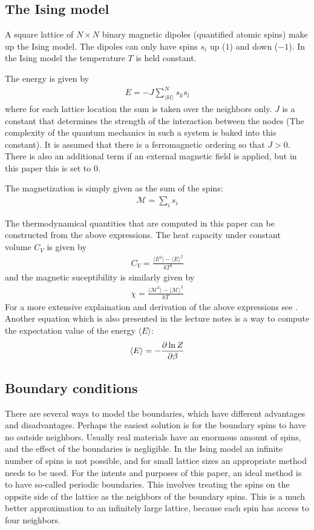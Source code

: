 \documentclass[aps,reprint]{revtex4-1}
\newcommand{\mean}[1]{\langle #1 \rangle}
\begin{document}
\subsection{The Ising model}
A square lattice of $N \times N$ binary magnetic dipoles (quantified atomic spins)
make up the Ising model. The dipoles can only have spins $s_i$ up ($1$) and down ($-1$).
In the Ising model the temperature $T$ is held constant.

The energy is given by
\begin{align}\label{eq:energy}
  E = -J \sum_{\langle kl \rangle}^{N} s_k s_l
\end{align}
where for each lattice location the sum is taken over the neighbors only. $J$ is
a constant that determines the strength of the interaction between the nodes
(The complexity of the quantum mechanics in such a system is baked into
this constant). It is assumed that there is a ferromagnetic ordering so that $J > 0$.
There is also an additional term if an external magnetic field is applied, but
in this paper this is set to $0$.

The magnetization is simply given as the sum of the spins:
\begin{align}\label{eq:magmom}
  \mathcal{M} = \sum_i s_i
\end{align}

The thermodynamical quantities that are computed in this paper can be constructed
from the above expressions. The heat capacity under constant volume $C_V$ is given
by
\begin{align}\label{eq:Cv}
  C_V = \frac{\mean{E^2} - \mean{E}^2}{kT^2}
\end{align}
and the magnetic suceptibility is similarly given by
\begin{align}\label{eq:sus}
  \chi = \frac{\mean{\mathcal{M}^2} - \mean{\mathcal{M}}^2}{kT}
\end{align}
For a more extensive explaination and derivation of the above expressions see
\cite{mortenjensen}. Another equation which is also presented in the lecture notes
is a way to compute the expectation value of the energy $\mean{E}$:
\begin{align}\label{eq:meanE}
  \mean{E} = - \pdv{\ln{Z}}{\beta}
\end{align}

\subsection{Boundary conditions}
There are several ways to model the boundaries, which have different advantages
and disadvantages. Perhaps the easiest solution is for the boundary spins to have
no outside neighbors. Usually real materials have an enormous amount of spins,
and the effect of the boundaries is negligible. In the Ising model an infinite
number of spins is not possible, and for small lattice sizes an appropriate
method needs to be used. For the intents and purposes of this paper, an ideal
method is to have so-called periodic boundaries. This involves treating the
spins on the oppsite side of the lattice as the neighbors of the boundary spins.
This is a much better approximation to an infinitely large lattice, because
each spin has access to four neighbors.
\end{document}
